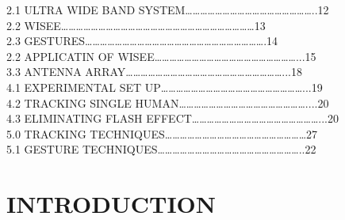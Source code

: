 \documentclass[a4paper,12pt,oneside]{article}
\begin{document}
\begin{center}
\vspace{5mm}
\listoffigures
\vspace{5mm}
2.1 ULTRA WIDE BAND SYSTEM……………………………………………..12
\\
\vspace{4mm}
2.2 WISEE……………………………………………………………………13
\\
\vspace{4mm}
2.3 GESTURES……………………………………………………………….14
\\
\vspace{4mm}
2.2 APPLICATIN OF WISEE…………………………………………………...15
\\
\vspace{4mm}
3.3 ANTENNA ARRAY………………………………………………………...18
\\
\vspace{4mm}
4.1 EXPERIMENTAL SET UP…………………………………………………...19
\\
\vspace{4mm}
4.2 TRACKING SINGLE HUMAN……………………………………………....20
\\
\vspace{4mm}
4.3 ELIMINATING FLASH EFFECT……………………………………………...20
\\
\vspace{4mm}
5.0 TRACKING TECHNIQUES…………………………………………………27
\\
\vspace{4mm}
5.1 GESTURE TECHNIQUES…………………………………………………..22

\end{center}





\newpage
\rfoot{\thepage}



\rfoot{\thepage}

\renewcommand{\headrulewidth}{0.0pt}
\renewcommand{\footrulewidth}{0.0pt}




\renewcommand{\headrulewidth}{0.0pt}
\renewcommand{\footrulewidth}{0.0pt}



\section{INTRODUCTION}
\end{document}
